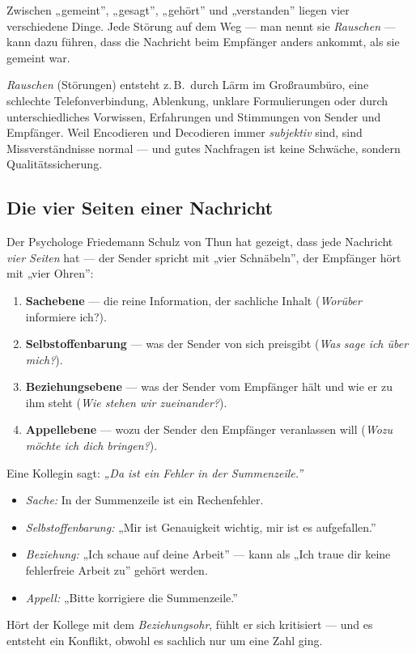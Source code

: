 \documentclass[11pt, a4paper]{article}
\begin{document}
\begin{merksatz}
Zwischen „gemeint”, „gesagt”, „gehört” und „verstanden” liegen vier verschiedene Dinge.
Jede Störung auf dem Weg --- man nennt sie \emph{Rauschen} --- kann dazu führen, dass die
Nachricht beim Empfänger anders ankommt, als sie gemeint war.
\end{merksatz}

\emph{Rauschen} (Störungen) entsteht z.\,B.\ durch Lärm im Großraumbüro, eine schlechte
Telefonverbindung, Ablenkung, unklare Formulierungen oder durch unterschiedliches
Vorwissen, Erfahrungen und Stimmungen von Sender und Empfänger. Weil Encodieren und
Decodieren immer \emph{subjektiv} sind, sind Missverständnisse normal --- und gutes
Nachfragen ist keine Schwäche, sondern Qualitätssicherung.

\subsection{Die vier Seiten einer Nachricht}

Der Psychologe Friedemann Schulz von Thun hat gezeigt, dass jede Nachricht
\emph{vier Seiten} hat --- der Sender spricht mit „vier Schnäbeln”, der Empfänger hört
mit „vier Ohren”:

\begin{enumerate}
  \item \textbf{Sachebene} --- die reine Information, der sachliche Inhalt (\emph{Worüber}
    informiere ich?).
  \item \textbf{Selbstoffenbarung} --- was der Sender von sich preisgibt (\emph{Was}
    \emph{sage ich über mich?}).
  \item \textbf{Beziehungsebene} --- was der Sender vom Empfänger hält und wie er zu ihm
    steht (\emph{Wie stehen wir zueinander?}).
  \item \textbf{Appellebene} --- wozu der Sender den Empfänger veranlassen will
    (\emph{Wozu möchte ich dich bringen?}).
\end{enumerate}

\begin{beispiel}
Eine Kollegin sagt: \emph{„Da ist ein Fehler in der Summenzeile.”}
\begin{itemize}[itemsep=0pt]
  \item \emph{Sache:} In der Summenzeile ist ein Rechenfehler.
  \item \emph{Selbstoffenbarung:} „Mir ist Genauigkeit wichtig, mir ist es aufgefallen.”
  \item \emph{Beziehung:} „Ich schaue auf deine Arbeit” --- kann als „Ich traue dir keine
    fehlerfreie Arbeit zu” gehört werden.
  \item \emph{Appell:} „Bitte korrigiere die Summenzeile.”
\end{itemize}
Hört der Kollege mit dem \emph{Beziehungsohr}, fühlt er sich kritisiert --- und es
entsteht ein Konflikt, obwohl es sachlich nur um eine Zahl ging.
\end{beispiel}
\end{document}
